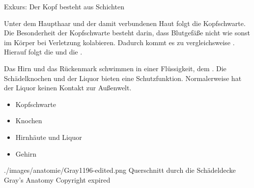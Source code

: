 \TextSlidePicture
{Exkurs: Der Kopf besteht aus Schichten}%
{%
%
%
Unter dem Haupthaar und der damit verbundenen Haut folgt die
Kopfschwarte. Die Besonderheit der Kopfschwarte besteht
darin, dass Blutgefäße nicht wie sonst im Körper bei
Verletzung kolabieren. Dadurch kommt es  zu vergleichsweise .
Hierauf folgt die  und die .  

Das Hirn und das Rückenmark schwimmen in einer
Flüssigkeit, dem . 
%
Die Schädelknochen und der Liquor bieten eine Schutzfunktion. 
%
Normalerweise hat der Liquor keinen Kontakt zur Außenwelt.
}%
{
\begin{itemize}
    \item Kopfschwarte
    \item Knochen
    \item Hirnhäute und Liquor
    \item Gehirn
\end{itemize}}%
{./images/anatomie/Gray1196-edited.png}%
{Querschnitt durch die Schädeldecke}%
{}%
{Gray's Anatomy}%
{Copyright expired}%


\begin{Synopsis}
\end{Synopsis}

